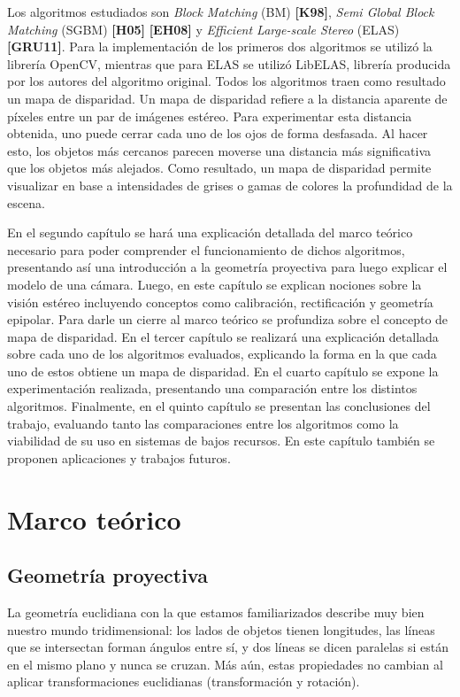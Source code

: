 \documentclass[11pt,a4paper,titlepage]{article}
\newcommand{\Cite}[1]{\textbf{[#1]}}
\begin{document}
Los algoritmos estudiados son \textit{Block Matching} (BM) \Cite{K98}, \textit{Semi Global Block Matching} (SGBM) \Cite{H05} \Cite{EH08} y \textit{Efficient Large-scale Stereo} (ELAS) \Cite{GRU11}. Para la implementación de los primeros dos algoritmos se utilizó la librería OpenCV, mientras que para ELAS se utilizó LibELAS, librería producida por los autores del algoritmo original. Todos los algoritmos traen como resultado un mapa de disparidad. Un mapa de disparidad refiere a la distancia aparente de píxeles entre un par de imágenes estéreo. Para experimentar esta distancia obtenida, uno puede cerrar cada uno de los ojos de forma desfasada. Al hacer esto, los objetos más cercanos parecen moverse una distancia más significativa que los objetos más alejados. Como resultado, un mapa de disparidad permite visualizar en base a intensidades de grises o gamas de colores la profundidad de la escena.

En el segundo capítulo se hará una explicación detallada del marco teórico necesario para poder comprender el funcionamiento de dichos algoritmos, presentando así una introducción a la geometría proyectiva para luego explicar el modelo de una cámara. Luego, en este capítulo se explican nociones sobre la visión estéreo incluyendo conceptos como calibración, rectificación y geometría epipolar. Para darle un cierre al marco teórico se profundiza sobre el concepto de mapa de disparidad. En el tercer capítulo se realizará una explicación detallada sobre cada uno de los algoritmos evaluados, explicando la forma en la que cada uno de estos obtiene un mapa de disparidad. En el cuarto capítulo se expone la experimentación realizada, presentando una comparación entre los distintos algoritmos. Finalmente, en el quinto capítulo se presentan las conclusiones del trabajo, evaluando tanto las comparaciones entre los algoritmos como la viabilidad de su uso en sistemas de bajos recursos. En este capítulo también se proponen aplicaciones y trabajos futuros.

\newpage

\section{Marco teórico}

\subsection{Geometría proyectiva}

La geometría euclidiana con la que estamos familiarizados describe muy bien nuestro mundo tridimensional: los lados de objetos tienen longitudes, las líneas que se intersectan forman ángulos entre sí, y dos líneas se dicen paralelas si están en el mismo plano y nunca se cruzan. Más aún, estas propiedades no cambian al aplicar transformaciones euclidianas (transformación y rotación).
\end{document}
